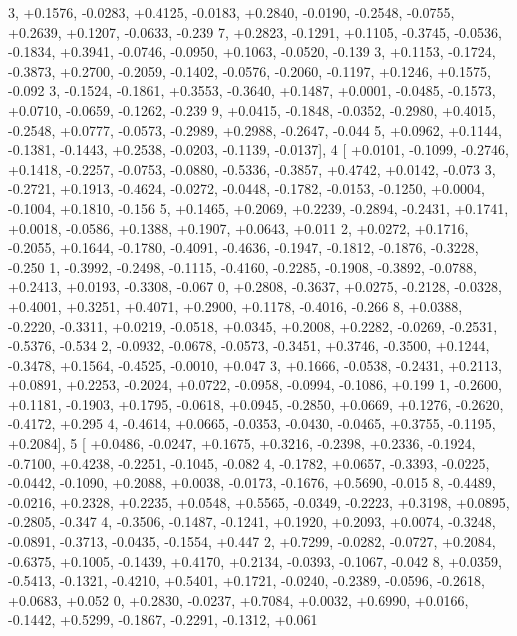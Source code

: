 \begin{DoxyCode}
      3, +0.1576, -0.0283, +0.4125, -0.0183, +0.2840, -0.0190, -0.2548, -0.0755, +0.2639, +0.1207, -0.0633, -0.239
      7, +0.2823, -0.1291, +0.1105, -0.3745, -0.0536, -0.1834, +0.3941, -0.0746, -0.0950, +0.1063, -0.0520, -0.139
      3, +0.1153, -0.1724, -0.3873, +0.2700, -0.2059, -0.1402, -0.0576, -0.2060, -0.1197, +0.1246, +0.1575, -0.092
      3, -0.1524, -0.1861, +0.3553, -0.3640, +0.1487, +0.0001, -0.0485, -0.1573, +0.0710, -0.0659, -0.1262, -0.239
      9, +0.0415, -0.1848, -0.0352, -0.2980, +0.4015, -0.2548, +0.0777, -0.0573, -0.2989, +0.2988, -0.2647, -0.044
      5, +0.0962, +0.1144, -0.1381, -0.1443, +0.2538, -0.0203, -0.1139, -0.0137],
4 [ +0.0101, -0.1099, -0.2746, +0.1418, -0.2257, -0.0753, -0.0880, -0.5336, -0.3857, +0.4742, +0.0142, -0.073
      3, -0.2721, +0.1913, -0.4624, -0.0272, -0.0448, -0.1782, -0.0153, -0.1250, +0.0004, -0.1004, +0.1810, -0.156
      5, +0.1465, +0.2069, +0.2239, -0.2894, -0.2431, +0.1741, +0.0018, -0.0586, +0.1388, +0.1907, +0.0643, +0.011
      2, +0.0272, +0.1716, -0.2055, +0.1644, -0.1780, -0.4091, -0.4636, -0.1947, -0.1812, -0.1876, -0.3228, -0.250
      1, -0.3992, -0.2498, -0.1115, -0.4160, -0.2285, -0.1908, -0.3892, -0.0788, +0.2413, +0.0193, -0.3308, -0.067
      0, +0.2808, -0.3637, +0.0275, -0.2128, -0.0328, +0.4001, +0.3251, +0.4071, +0.2900, +0.1178, -0.4016, -0.266
      8, +0.0388, -0.2220, -0.3311, +0.0219, -0.0518, +0.0345, +0.2008, +0.2282, -0.0269, -0.2531, -0.5376, -0.534
      2, -0.0932, -0.0678, -0.0573, -0.3451, +0.3746, -0.3500, +0.1244, -0.3478, +0.1564, -0.4525, -0.0010, +0.047
      3, +0.1666, -0.0538, -0.2431, +0.2113, +0.0891, +0.2253, -0.2024, +0.0722, -0.0958, -0.0994, -0.1086, +0.199
      1, -0.2600, +0.1181, -0.1903, +0.1795, -0.0618, +0.0945, -0.2850, +0.0669, +0.1276, -0.2620, -0.4172, +0.295
      4, -0.4614, +0.0665, -0.0353, -0.0430, -0.0465, +0.3755, -0.1195, +0.2084],
5 [ +0.0486, -0.0247, +0.1675, +0.3216, -0.2398, +0.2336, -0.1924, -0.7100, +0.4238, -0.2251, -0.1045, -0.082
      4, -0.1782, +0.0657, -0.3393, -0.0225, -0.0442, -0.1090, +0.2088, +0.0038, -0.0173, -0.1676, +0.5690, -0.015
      8, -0.4489, -0.0216, +0.2328, +0.2235, +0.0548, +0.5565, -0.0349, -0.2223, +0.3198, +0.0895, -0.2805, -0.347
      4, -0.3506, -0.1487, -0.1241, +0.1920, +0.2093, +0.0074, -0.3248, -0.0891, -0.3713, -0.0435, -0.1554, +0.447
      2, +0.7299, -0.0282, -0.0727, +0.2084, -0.6375, +0.1005, -0.1439, +0.4170, +0.2134, -0.0393, -0.1067, -0.042
      8, +0.0359, -0.5413, -0.1321, -0.4210, +0.5401, +0.1721, -0.0240, -0.2389, -0.0596, -0.2618, +0.0683, +0.052
      0, +0.2830, -0.0237, +0.7084, +0.0032, +0.6990, +0.0166, -0.1442, +0.5299, -0.1867, -0.2291, -0.1312, +0.061

\end{DoxyCode}
